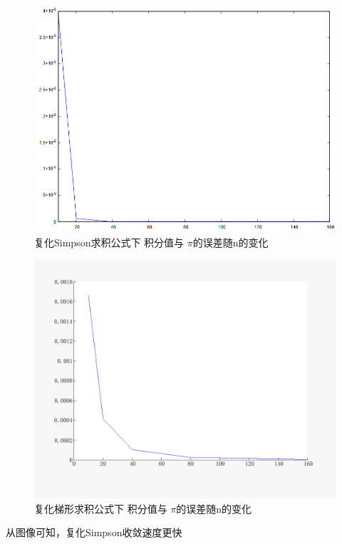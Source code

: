\documentclass{xtupaper}
\begin{document}
\begin{figure}[htp]%
	\centering  %
	\includegraphics[scale=0.5]{Sm1} 
	\caption{复化Simpson求积公式下 积分值与 $ \pi $的误差随n的变化}  %
	\label{Sm1}
\end{figure}
\begin{figure}[htp]%
	\centering  %
	\includegraphics[scale=0.5]{tixing1} 
	\caption{复化梯形求积公式下 积分值与 $ \pi $的误差随n的变化}  %
	\label{tx1}
	

\end{figure}
		从图像可知，复化Simpson收敛速度更快
\end{document}
